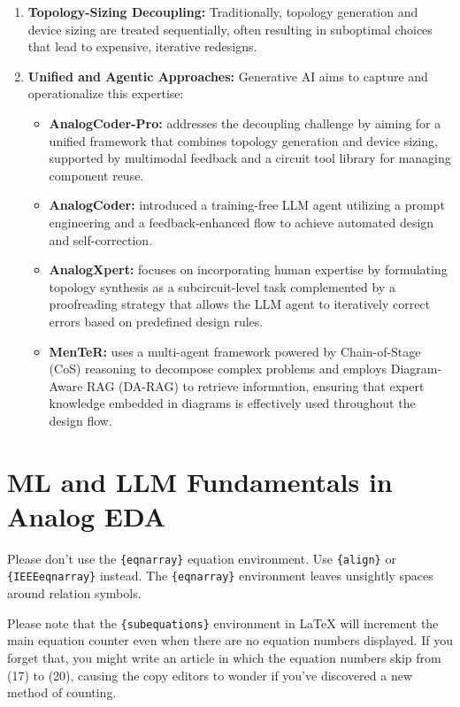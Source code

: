 \documentclass{ieeeaccess}
\begin{document}
\begin{enumerate}
    \item \textbf{Topology-Sizing Decoupling:} Traditionally, topology generation and device sizing are treated sequentially, often resulting in suboptimal choices that lead to expensive, iterative redesigns.
    \item \textbf{Unified and Agentic Approaches:} Generative AI aims to capture and operationalize this expertise:
        \begin{itemize}
            \item \textbf{AnalogCoder-Pro:} addresses the decoupling challenge by aiming for a unified framework that combines topology generation and device sizing, supported by multimodal feedback and a circuit tool library for managing component reuse.
            \item \textbf{AnalogCoder:} introduced a training-free LLM agent utilizing a prompt engineering and a feedback-enhanced flow to achieve automated design and self-correction.
            \item \textbf{AnalogXpert:} focuses on incorporating human expertise by formulating topology synthesis as a subcircuit-level task complemented by a proofreading strategy that allows the LLM agent to iteratively correct errors based on predefined design rules.
            \item \textbf{MenTeR:} uses a multi-agent framework powered by Chain-of-Stage (CoS) reasoning to decompose complex problems and employs Diagram-Aware RAG (DA-RAG) to retrieve information, ensuring that expert knowledge embedded in diagrams is effectively used throughout the design flow.
        \end{itemize}
\end{enumerate}

\section{ML and LLM Fundamentals in Analog EDA}

Please don't use the \verb|{eqnarray}| equation environment. Use
\verb|{align}| or \verb|{IEEEeqnarray}| instead. The \verb|{eqnarray}|
environment leaves unsightly spaces around relation symbols.

Please note that the \verb|{subequations}| environment in {\LaTeX}
will increment the main equation counter even when there are no
equation numbers displayed. If you forget that, you might write an
article in which the equation numbers skip from (17) to (20), causing
the copy editors to wonder if you've discovered a new method of
counting.
\end{document}
